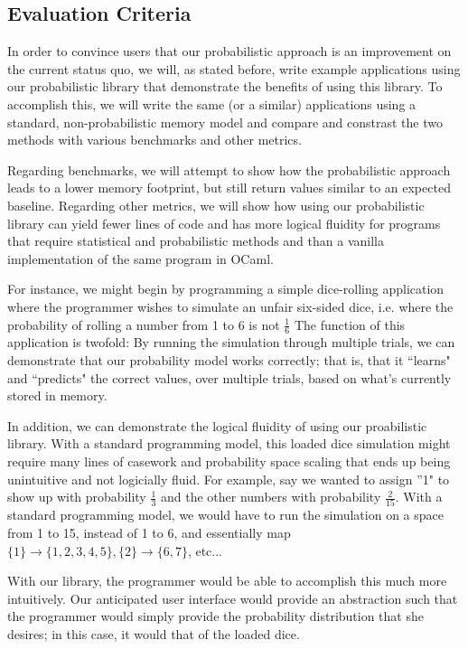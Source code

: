 \documentclass{sig-alternate}
\begin{document}
\subsection{Evaluation Criteria}
\label{subsec:eval_criteria}
In order to convince users that our probabilistic approach is an improvement on the
current status quo, we will, as stated before, write example applications using our 
probabilistic library that demonstrate the benefits of using this library. To accomplish 
this, we will write the same (or a similar) applications using a standard, non-probabilistic memory model
and compare and constrast the two methods with various benchmarks and other metrics.

Regarding benchmarks, we will attempt to show how the probabilistic approach leads to 
a lower memory footprint, but still return values similar to an expected baseline. 
Regarding other metrics, we will show how using our probabilistic library can yield 
fewer lines of code and has more logical fluidity for programs that require statistical 
and probabilistic methods and than a vanilla implementation of the same program in OCaml. 

For instance, we might begin by programming a simple dice-rolling application where the programmer wishes
to simulate an unfair six-sided dice, i.e. where the probability of rolling a number from 1 to 6 is not $\frac{1}{6}$
The function of this application is twofold: By running the simulation through multiple trials, we can demonstrate 
that our probability model works correctly; that is, that it ``learns" and ``predicts" the correct values, over multiple trials,
based on what's currently stored in memory.

In addition, we can demonstrate the logical fluidity of using our proabilistic library.
With a standard programming model, this loaded dice simulation might require many lines of casework and probability space scaling
that ends up being unintuitive and not logicially fluid. For example, say we wanted to assign ''1" to show up with probability $\frac{1}{3}$
and the other numbers with probability $\frac{2}{15}$. With a standard programming model, we would have to run the simulation on a space from
1 to 15, instead of 1 to 6, and essentially map $\{1\} \rightarrow \{1, 2, 3, 4, 5\}, \{2\} \rightarrow \{6, 7\}$, etc...

With our library, the programmer would be able to accomplish this much more intuitively. Our
anticipated user interface would provide an abstraction such that the programmer would simply
provide the probability distribution that she desires; in this case, it would that of the loaded dice.
\end{document}
